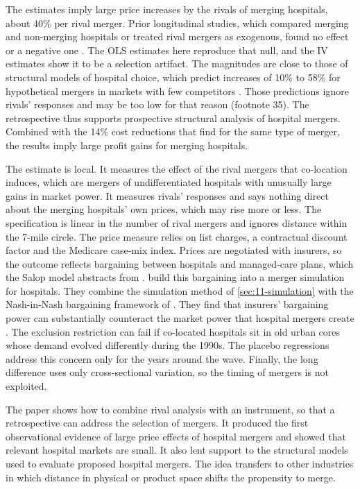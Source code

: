  The estimates imply large price increases by the rivals of merging hospitals, about 40\%
per rival merger. Prior longitudinal studies, which compared merging and non-merging hospitals or treated rival
mergers as exogenous, found no effect or a negative one \citep{ConnorFeldman1998}. The OLS estimates here reproduce
that null, and the IV estimates show it to be a selection artifact. The magnitudes are close to those of
structural models of hospital choice, which predict increases of 10\% to 58\% for hypothetical mergers in markets
with few competitors \citep{CappsDranoveSatterthwaite2003,GaynorVogt2003}. Those predictions ignore rivals'
responses and may be too low for that reason (footnote 35). The retrospective thus supports prospective structural
analysis of hospital mergers. Combined with the 14\% cost reductions that \citet{DranoveLindrooth2003} find for the
same type of merger, the results imply large profit gains for merging hospitals.

 The estimate is local. It measures the effect of the rival mergers that co-location induces,
which are mergers of undifferentiated hospitals with unusually large gains in market power. It measures rivals'
responses and says nothing direct about the merging hospitals' own prices, which may rise more or less. The
specification is linear in the number of rival mergers and ignores distance within the 7-mile circle. The price
measure relies on list charges, a contractual discount factor and the Medicare case-mix index. Prices are
negotiated with insurers, so the outcome reflects bargaining between hospitals and managed-care plans, which the
Salop model abstracts from \citep{GalOr1999,CappsDranoveSatterthwaite2003,Ho2009}. \citet{GowrisankaranNevoTown2015}
build this bargaining into a merger simulation for hospitals. They combine the simulation method of
\cref{sec:11-simulation} with the Nash-in-Nash bargaining framework of \citet{CrawfordYurukoglu2012}. They find
that insurers' bargaining power can substantially counteract the market power that hospital mergers create
\citep[p.~238]{AskerNocke2021}. The exclusion restriction can
fail if co-located hospitals sit in old urban cores whose demand evolved differently during the 1990s. The placebo
regressions address this concern only for the years around the wave. Finally, the long difference uses only
cross-sectional variation, so the timing of mergers is not exploited.

 The paper shows how to combine rival analysis with an instrument, so that a retrospective
can address the selection of mergers. It produced the first observational evidence of large price effects of
hospital mergers and showed that relevant hospital markets are small. It also lent support to the structural models
used to evaluate proposed hospital mergers. The idea transfers to other industries in which distance in physical or
product space shifts the propensity to merge.

